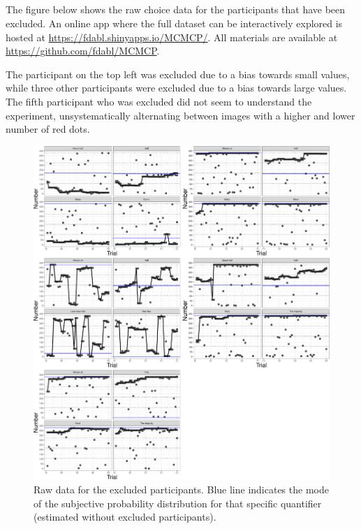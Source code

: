 \documentclass[english,floatsintext,man]{apa6}
\begin{document}
  \begin{appendix}
  \section{}
  The figure below shows the raw choice data for the participants that
  have been excluded. An online app where the full dataset can be
  interactively explored is hosted at
  \mbox{\href{https://fdabl.shinyapps.io/MCMCP/}{https://fdabl.shinyapps.io/MCMCP/}}.
  All materials are available at
  \mbox{\href{https://github.com/fdabl/MCMCP}{https://github.com/fdabl/MCMCP}}.
  
  The participant on the top left was excluded due to a bias towards small
  values, while three other participants were excluded due to a bias
  towards large values. The fifth participant who was excluded did not
  seem to understand the experiment, unsystematically alternating between
  images with a higher and lower number of red dots.
  
  \begin{figure}
  \centering
  \includegraphics{manuscript_files/figure-latex/unnamed-chunk-12-1.pdf}
  \caption{\label{fig:unnamed-chunk-12}Raw data for the excluded participants.
  Blue line indicates the mode of the subjective probability distribution
  for that specific quantifier (estimated without excluded participants).}
  \end{figure}
  
  \hypertarget{refs}{}
  \end{appendix}
\end{document}
